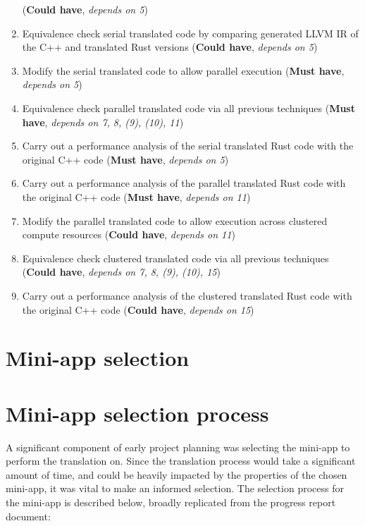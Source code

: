 \begin{enumerate}
  (\textbf{Could have}, \textit{depends on 5})
\item
  Equivalence check serial translated code by comparing generated LLVM IR of the C++ and translated Rust versions
  (\textbf{Could have}, \textit{depends on 5})
\item
  Modify the serial translated code to allow parallel execution
  (\textbf{Must have}, \textit{depends on 5})
\item
  Equivalence check parallel translated code via all previous techniques
  (\textbf{Must have}, \textit{depends on 7, 8, (9), (10), 11})
\item
  Carry out a performance analysis of the serial translated Rust code with the original C++ code
  (\textbf{Must have}, \textit{depends on 5})
\item
  Carry out a performance analysis of the parallel translated Rust code with the original C++ code
  (\textbf{Must have}, \textit{depends on 11})
\item
  Modify the parallel translated code to allow execution across clustered compute resources
  (\textbf{Could have}, \textit{depends on 11})
\item
  Equivalence check clustered translated code via all previous techniques
  (\textbf{Could have}, \textit{depends on 7, 8, (9), (10), 15})
\item
  Carry out a performance analysis of the clustered translated Rust code with the original C++ code
  (\textbf{Could have}, \textit{depends on 15})
\end{enumerate}

\section{Mini-app selection}
\label{sec:miniapp-selection}



\section{Mini-app selection process}
\label{sec:miniapp-selection}

A significant component of early project planning was selecting the mini-app to perform the translation on. Since the translation process would take a significant amount of time, and could be heavily impacted by the properties of the chosen mini-app, it was vital to make an informed selection. The selection process for the mini-app is described below, broadly replicated from the progress report document:

